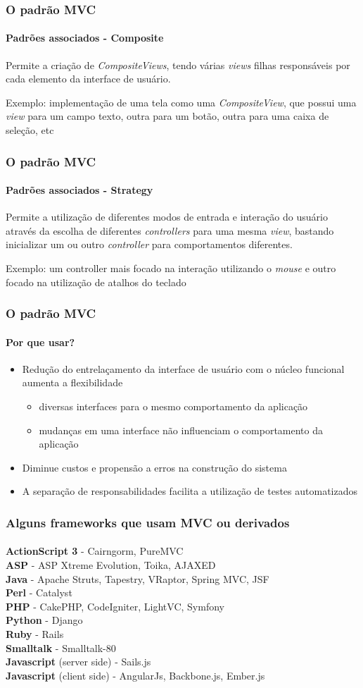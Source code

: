 \documentclass{beamer}
\begin{document}
\begin{frame}
\frametitle{O padrão MVC}
\framesubtitle{Padrões associados - Composite}
  Permite a criação de \textit{CompositeViews}, tendo várias \textit{views} filhas responsáveis por cada elemento da interface de usuário.

  Exemplo: implementação de uma tela como uma \textit{CompositeView}, que possui uma \textit{view} para um campo texto, outra para um botão, outra para uma caixa de seleção, etc
\end{frame}

\begin{frame}
\frametitle{O padrão MVC}
\framesubtitle{Padrões associados - Strategy}
	Permite a utilização de diferentes modos de entrada e interação do usuário através da escolha de diferentes \textit{controllers} para uma mesma \textit{view}, bastando inicializar um ou outro \textit{controller} para comportamentos diferentes.

  Exemplo: um controller mais focado na interação utilizando o \textit{mouse} e outro focado na utilização de atalhos do teclado
\end{frame}

\begin{frame}
\frametitle{O padrão MVC}
\framesubtitle{Por que usar?}
\begin{itemize}
	\item Redução do entrelaçamento da interface de usuário com o núcleo funcional aumenta a flexibilidade
\begin{itemize}
  \item diversas interfaces para o mesmo comportamento da aplicação
  \item mudanças em uma interface não influenciam o comportamento da aplicação
\end{itemize}
	\item Diminue custos e propensão a erros na construção do sistema
	\item A separação de responsabilidades facilita a utilização de testes automatizados
\end{itemize}
\end{frame}


\begin{frame}
\frametitle{Alguns frameworks que usam MVC ou derivados}
\framesubtitle{}
	\textbf{ActionScript 3} - Cairngorm, PureMVC\\
	\textbf{ASP} - ASP Xtreme Evolution, Toika, AJAXED\\
	\textbf{Java} - Apache Struts, Tapestry, VRaptor, Spring MVC, JSF\\
	\textbf{Perl} - Catalyst\\
	\textbf{PHP} - CakePHP, CodeIgniter, LightVC, Symfony\\
	\textbf{Python} - Django\\
	\textbf{Ruby} - Rails\\
	\textbf{Smalltalk} - Smalltalk-80\\
	\textbf{Javascript} (server side) - Sails.js\\
	\textbf{Javascript} (client side) - AngularJs, Backbone.js, Ember.js\\
\end{frame}
\end{document}
